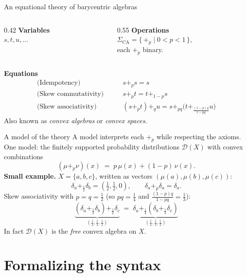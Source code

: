 \documentclass[10pt,aspectratio=169]{beamer}
\newcommand{\Dist}{\mathcal{D}}
\newcommand{\bpl}[1]{+_{#1}}
\begin{document}
\begin{frame}{An equational theory of barycentric algebras}
  \begin{columns}[T]
    \begin{column}{0.42\textwidth}
      \textbf{Variables}\\[0.3em]
      $s,t,u,\dots$
    \end{column}
    \begin{column}{0.55\textwidth}
      \textbf{Operations}\\[0.3em]
      $\Sigma_{\mathrm{CA}} = \{\,\bpl{p} \mid 0 < p < 1\,\}$,\\
      each $\bpl{p}$ binary.
    \end{column}
  \end{columns}
  \vfill
  \textbf{Equations}
  \begin{align*}
    \text{(Idempotency)}\qquad & s \bpl{p} s = s\\[0.3em]
    \text{(Skew commutativity)}\qquad & s \bpl{p} t = t \bpl{1-p} s\\[0.3em]
    \text{(Skew associativity)}\qquad & (s \bpl{p} t) \bpl{q} u
      = s \bpl{pq} \bigl(t \bpl{\frac{(1-p)q}{1-pq}} u\bigr)
  \end{align*}
  \vfill
  {\footnotesize Also known as \emph{convex algebras} or \emph{convex spaces}.}
\end{frame}

\begin{frame}{A model of the theory}
  A model interprets each $\bpl{p}$ while respecting the axioms.
  \vfill
  One model: the finitely supported probability distributions
  $\Dist(X)$ with convex combinations
  \[
    (\mu \bpl{p} \nu)(x) \;=\; p\,\mu(x) + (1-p)\,\nu(x).
  \]
  \vfill
  \pause
  \textbf{Small example.} $X = \{a,b,c\}$, written as vectors
  $(\mu(a),\mu(b),\mu(c))$:
  \[
    \delta_a \bpl{\frac12} \delta_b = (\tfrac12,\tfrac12,0),
    \qquad
    \delta_a \bpl{p} \delta_a = \delta_a .
  \]
  \pause
  Skew associativity with $p = q = \tfrac12$
  (so $pq = \tfrac14$ and $\tfrac{(1-p)q}{1-pq} = \tfrac13$):
  \[
    \underbrace{(\delta_a \bpl{\frac12} \delta_b) \bpl{\frac12} \delta_c}
      _{(\frac14,\frac14,\frac12)}
    \;=\;
    \underbrace{\delta_a \bpl{\frac14}
      (\delta_b \bpl{\frac13} \delta_c)}_{(\frac14,\frac14,\frac12)}
  \]
  \vfill
  {\footnotesize In fact $\Dist(X)$ is the \emph{free} convex algebra on $X$.}
\end{frame}

\section{Formalizing the syntax}
\end{document}
